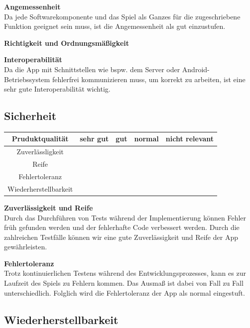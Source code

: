 \documentclass[parskip=full]{scrartcl}
\begin{document}
\textbf{Angemessenheit}\\
Da jede Softwarekomponente und das Spiel als Ganzes für die zugeschriebene Funktion geeignet sein muss, ist die Angemessenheit als gut einzustufen.

\textbf{Richtigkeit und Ordnungsmäßigkeit}

\textbf{Interoperabilität}\\
Da die App mit Schnittstellen wie bspw. dem Server oder Android-Betriebssystem fehlerfrei kommunizieren muss, um korrekt zu arbeiten, ist eine sehr gute Interoperabilität wichtig.

\subsection{Sicherheit}
\begin{tabular}{| c | c | c | c | c |}
    \hline
    \textbf{Pruduktqualität} & \textbf{sehr gut} & \textbf{gut} & \textbf{normal} & \textbf{nicht relevant} \\ \hline
    Zuverlässligkeit         &                   &              &                 &                         \\ \hline
    Reife                    &                   &              &                 &                         \\ \hline
    Fehlertoleranz           &                   &              &                 &                         \\ \hline
    Wiederherstellbarkeit    &                   &              &                 &                         \\ \hline
\end{tabular}

\textbf{Zuverlässigkeit und Reife}\\
Durch das Durchführen von Tests während der Implementierung können Fehler früh gefunden werden und der fehlerhafte Code verbessert werden.
Durch die zahlreichen Testfälle können wir eine gute Zuverlässigkeit und Reife der App gewährleisten.

\textbf{Fehlertoleranz}\\
Trotz kontinuierlichen Testens während des Entwicklungsprozesses, kann es zur Laufzeit des Spiels zu Fehlern kommen.
Das Ausmaß ist dabei von Fall zu Fall unterschiedlich.
Folglich wird die Fehlertoleranz der App als normal eingestuft.

\subsection{Wiederherstellbarkeit}
\end{document}

